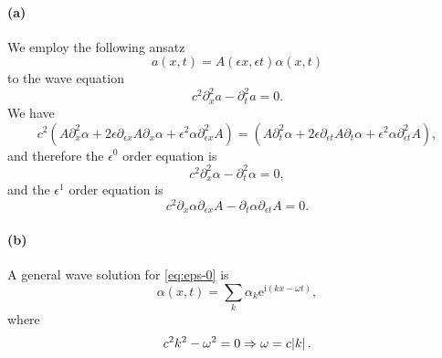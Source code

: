 \documentclass[hyperref, a4paper]{article}
\newcommand*{\ii}{\mathrm{i}}
\newcommand*{\ee}{\mathrm{e}}
\begin{document}
\paragraph{(a)} We employ the following ansatz 
\begin{equation}
    a(x, t) = A(\epsilon x, \epsilon t) \alpha(x, t)
\end{equation}
to the wave equation 
\begin{equation}
    c^2 \partial_x^2 a - \partial_t^2 a = 0.
\end{equation}
We have 
\begin{equation}
    c^2 \left(
        A \partial_x^2 \alpha 
        + 2 \epsilon \partial_{\epsilon x} A \partial_x \alpha
        + \epsilon^2 \alpha \partial_{\epsilon x}^2 A
    \right) = 
    \left(
        A \partial_t^2 \alpha 
        + 2 \epsilon \partial_{\epsilon t} A \partial_t \alpha
        + \epsilon^2 \alpha \partial_{\epsilon t}^2 A
    \right),
\end{equation}
and therefore the $\epsilon^0$ order equation is 
\begin{equation}
    c^2 \partial_x^2 \alpha - \partial_t^2 \alpha = 0,
    \label{eq:eps-0}
\end{equation}
and the $\epsilon^1$ order equation is 
\begin{equation}
    c^2 \partial_x \alpha \partial_{\epsilon x} A - \partial_t \alpha \partial_{\epsilon t} A = 0.
    \label{eq:eps-1}
\end{equation}

\paragraph{(b)} A general wave solution for \eqref{eq:eps-0} is 
\begin{equation}
    \alpha(x, t) = \sum_{k} \alpha_k \ee^{\ii (k x - \omega t)},
    \label{eq:fourier-alpha}
\end{equation}
where 
\begin{equation}
    c^2 k^2 - \omega^2 = 0 \Rightarrow
    \omega = c \abs*{k}.
\end{equation}
\end{document}

